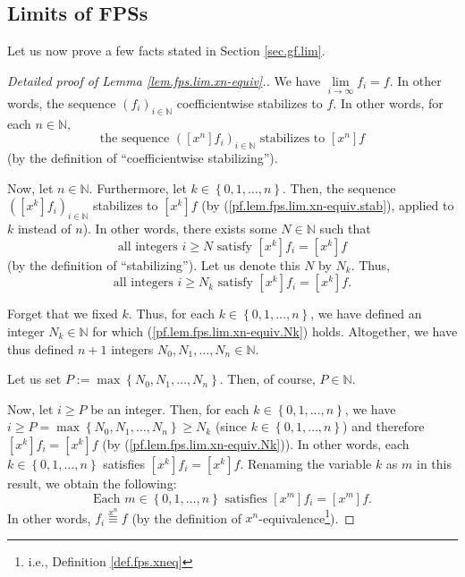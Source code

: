 \subsection{\label{sec.details.gf.lim}Limits of FPSs}

\begin{fineprint}
Let us now prove a few facts stated in Section \ref{sec.gf.lim}.

\begin{proof}
[Detailed proof of Lemma \ref{lem.fps.lim.xn-equiv}.]We have $\lim
\limits_{i\rightarrow\infty}f_{i}=f$. In other words, the sequence $\left(
f_{i}\right)  _{i\in\mathbb{N}}$ coefficientwise stabilizes to $f$. In other
words, for each $n\in\mathbb{N}$,%
\begin{equation}
\text{the sequence }\left(  \left[  x^{n}\right]  f_{i}\right)  _{i\in
\mathbb{N}}\text{ stabilizes to }\left[  x^{n}\right]  f
\label{pf.lem.fps.lim.xn-equiv.stab}%
\end{equation}
(by the definition of \textquotedblleft coefficientwise
stabilizing\textquotedblright).

Now, let $n\in\mathbb{N}$. Furthermore, let $k\in\left\{  0,1,\ldots
,n\right\}  $. Then, the sequence $\left(  \left[  x^{k}\right]  f_{i}\right)
_{i\in\mathbb{N}}$ stabilizes to $\left[  x^{k}\right]  f$ (by
(\ref{pf.lem.fps.lim.xn-equiv.stab}), applied to $k$ instead of $n$). In other
words, there exists some $N\in\mathbb{N}$ such that%
\[
\text{all integers }i\geq N\text{ satisfy }\left[  x^{k}\right]  f_{i}=\left[
x^{k}\right]  f
\]
(by the definition of \textquotedblleft stabilizing\textquotedblright). Let us
denote this $N$ by $N_{k}$. Thus,
\begin{equation}
\text{all integers }i\geq N_{k}\text{ satisfy }\left[  x^{k}\right]
f_{i}=\left[  x^{k}\right]  f. \label{pf.lem.fps.lim.xn-equiv.Nk}%
\end{equation}


Forget that we fixed $k$. Thus, for each $k\in\left\{  0,1,\ldots,n\right\}
$, we have defined an integer $N_{k}\in\mathbb{N}$ for which
(\ref{pf.lem.fps.lim.xn-equiv.Nk}) holds. Altogether, we have thus defined
$n+1$ integers $N_{0},N_{1},\ldots,N_{n}\in\mathbb{N}$.

Let us set $P:=\max\left\{  N_{0},N_{1},\ldots,N_{n}\right\}  $. Then, of
course, $P\in\mathbb{N}$.

Now, let $i\geq P$ be an integer. Then, for each $k\in\left\{  0,1,\ldots
,n\right\}  $, we have $i\geq P=\max\left\{  N_{0},N_{1},\ldots,N_{n}\right\}
\geq N_{k}$ (since $k\in\left\{  0,1,\ldots,n\right\}  $) and therefore
$\left[  x^{k}\right]  f_{i}=\left[  x^{k}\right]  f$ (by
(\ref{pf.lem.fps.lim.xn-equiv.Nk})). In other words, each $k\in\left\{
0,1,\ldots,n\right\}  $ satisfies $\left[  x^{k}\right]  f_{i}=\left[
x^{k}\right]  f$. Renaming the variable $k$ as $m$ in this result, we obtain
the following:%
\[
\text{Each }m\in\left\{  0,1,\ldots,n\right\}  \text{ satisfies }\left[
x^{m}\right]  f_{i}=\left[  x^{m}\right]  f\text{.}%
\]
In other words, $f_{i}\overset{x^{n}}{\equiv}f$ (by the definition of $x^{n}%
$-equivalence\footnote{i.e., Definition \ref{def.fps.xneq}}).


\end{proof}
\end{fineprint}
